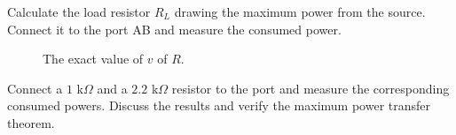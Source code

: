 \documentclass[11pt]{article}
\begin{document}
\begin{question}
\begin{subquestion}{Calculate the load resistor $R_L$ drawing the maximum power from the source. Connect it to the port AB and measure the consumed power.}
{\begin{figure}[H]
                \caption{The exact value of $v$ of $R$.}
            \end{figure}
        }
    \end{subquestion}

    \begin{subquestion}{Connect a $1$ k$\Omega$ and a $2.2$ k$\Omega$ resistor to the port and measure the corresponding consumed powers. Discuss the results and verify the maximum power transfer theorem.}
\end{subquestion}
\end{question}
\end{document}
